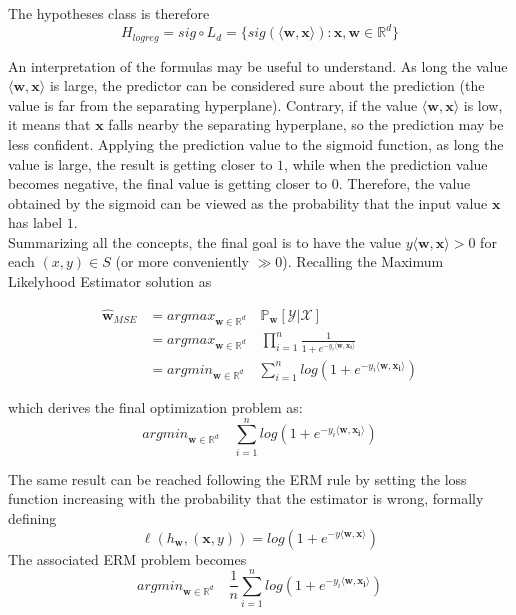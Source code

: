 The hypotheses class is therefore
\[ H_{logreg} = sig \circ L_d = \{ sig(\langle \mathbf{w}, \mathbf{x} \rangle) : \mathbf{x}, \mathbf{w} \in \mathbb{R}^d \} \]

An interpretation of the formulas may be useful to understand. As long the value $\langle \mathbf{w}, \mathbf{x} \rangle$ is large, the predictor can be considered sure about the prediction (the value is far from the separating hyperplane). Contrary, if the value $\langle \mathbf{w}, \mathbf{x} \rangle$ is low, it means that $\mathbf{x}$ falls nearby the separating hyperplane, so the prediction may be less confident. Applying the prediction value to the sigmoid function, as long the value is large, the result is getting closer to $1$, while when the prediction value becomes negative, the final value is getting closer to $0$.
Therefore, the value obtained by the sigmoid can be viewed as the probability that the input value $\mathbf{x}$ has label $1$.\\
Summarizing all the concepts, the final goal is to have the value $y \langle \mathbf{w}, \mathbf{x} \rangle > 0$ for each $(x, y) \in S$ (or more conveniently $\gg 0$). Recalling the Maximum Likelyhood Estimator solution as

\begin{align*}
 \hat{\mathbf{w}}_{MSE} &= argmax_{\mathbf{w} \in \mathbb{R}^d} \quad \mathbb{P}_\mathbf{w}[\mathcal{Y} | \mathcal{X}]	\\
 						&= argmax_{\mathbf{w} \in \mathbb{R}^d} \quad \prod_{i=1}^{n} \frac{1}{1 + e^{-y_i \langle \mathbf{w}, \mathbf{x_i} \rangle}}	\\
 						&= argmin_{\mathbf{w} \in \mathbb{R}^d} \quad \sum_{i=1}^{n} log(1 + e^{-y_i \langle \mathbf{w}, \mathbf{x_i} \rangle})
\end{align*}

which derives the final optimization problem as:
\[ argmin_{\mathbf{w} \in \mathbb{R}^d} \quad \sum_{i=1}^{n} log(1 + e^{-y_i \langle \mathbf{w}, \mathbf{x_i} \rangle}) \]

The same result can be reached following the ERM rule by setting the loss function increasing with the probability that the estimator is wrong, formally defining
\[ \ell (h_\mathbf{w}, (\mathbf{x}, y)) = log(1 + e^{-y \langle \mathbf{w}, \mathbf{x} \rangle}) \]
The associated ERM problem becomes
\[ argmin_{\mathbf{w} \in \mathbb{R}^d} \quad \frac{1}{n} \sum_{i=1}^{n} log(1 + e^{-y_i \langle \mathbf{w}, \mathbf{x_i} \rangle}) \]



